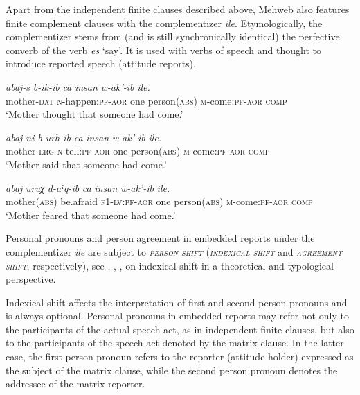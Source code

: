 ﻿\documentclass[output=paper]{langsci/langscibook}
\begin{document}
Apart from the independent finite clauses described above, Mehweb also
features finite complement clauses with the complementizer \emph{ile}.
Etymologically, the complementizer stems from (and is still
synchronically identical)  the perfective converb of the verb
\emph{es} `say'. It is used with verbs of speech and thought to
introduce reported speech (attitude reports).

\ea %
\ea %
\gll \emph{abaj-s} \emph{b-ik-ib} \emph{ca} \emph{insan} \emph{w-ak'-ib} \emph{ile.} \\
mother-\textsc{dat} \textsc{n}-happen:\textsc{pf}-\textsc{aor} one person(\textsc{abs}) \textsc{m}-come:\textsc{pf}-\textsc{aor} \textsc{comp}\\
\glt `Mother thought that someone had come.'

{
\ex %
\gll \emph{abaj-ni} \emph{b-urh-ib} \emph{ca} \emph{insan} \emph{w-ak'-ib} \emph{ile.}\\
mother-\textsc{erg} \textsc{n}-tell:\textsc{pf}-\textsc{aor} one person(\textsc{abs}) \textsc{m}-come:\textsc{pf}-\textsc{aor} \textsc{comp}\\
\glt `Mother said that someone had come.'

}
\ex %
\gll \emph{abaj} \emph{uruχ} \emph{d-aˤq-ib} \emph{ca} \emph{insan} \emph{w-ak'-ib} \emph{ile.}\\
mother(\textsc{abs}) be.afraid \textsc{f1}-\textsc{lv}:\textsc{pf}-\textsc{aor} one person(\textsc{abs}) \textsc{m}-come:\textsc{pf}-\textsc{aor} \textsc{comp}\\
\glt `Mother feared that someone had come.'
\z
\z

Personal pronouns and person agreement in embedded reports under the
complementizer \emph{ile} are subject to \emph{\textsc{person shift}}
(\emph{\textsc{indexical shift}} and \emph{\textsc{agreement shift}},
respectively), see \citet{schlenker2003}, \citet{anand-nevins2004}, \citet{nikitina2012}, \citet{shklovsky-sudo2014} on indexical shift in a theoretical
and typological perspective.


Indexical shift affects the interpretation of first and second person
pronouns and is always optional. Personal pronouns in embedded reports
may refer not only to the participants of the actual speech act, as in
independent finite clauses, but also to the participants of the speech
act denoted by the matrix clause. In the latter case, the first person
pronoun refers to the reporter (attitude holder) expressed as the
subject of the matrix clause, while the second person pronoun denotes
the addressee of the matrix reporter.
\end{document}
